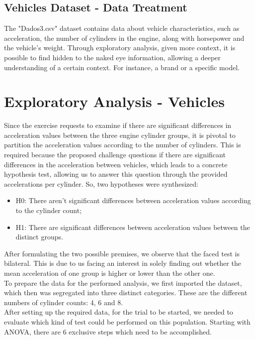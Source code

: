 \documentclass[conference]{IEEEtran}
\begin{document}
\subsection{Vehicles Dataset - Data Treatment}
The "Dados3.csv" dataset contains data about vehicle characteristics, such as acceleration, the number of cylinders in the engine, along with horsepower and the vehicle's weight.
Through exploratory analysis, given more context, it is possible to find hidden to the naked eye information, allowing a deeper understanding of a certain context.
For instance, a brand or a specific model.
\section{Exploratory Analysis - Vehicles}
Since the exercise requests to examine if there are significant differences in acceleration values between the three engine cylinder groups, 
it is pivotal to partition the acceleration values according to the number of cylinders. 
This is required because the proposed challenge questions if there are significant differences in the acceleration between vehicles, 
which leads to a concrete hypothesis test, allowing us to answer this question through the provided accelerations per cylinder.
So, two hypotheses were synthesized:

\begin{itemize}
    \item H0: There aren't significant differences between acceleration values according to the cylinder count;
    \item H1: There are significant differences between acceleration values between the distinct groups.
\end{itemize}

After formulating the two possible premises, we observe that the faced test is bilateral.
This is due to us facing an interest in solely finding out whether the mean acceleration of one group is higher or lower than the other one.\\

To prepare the data for the performed analysis, we first imported the dataset, which then was segregated into three distinct categories.
These are the different numbers of cylinder counts: 4, 6 and 8.\\

After setting up the required data, for the trial to be started, we needed to evaluate which kind of test could be performed on this population.
Starting with ANOVA, there are 6 exclusive steps which need to be accomplished.\\
\end{document}
